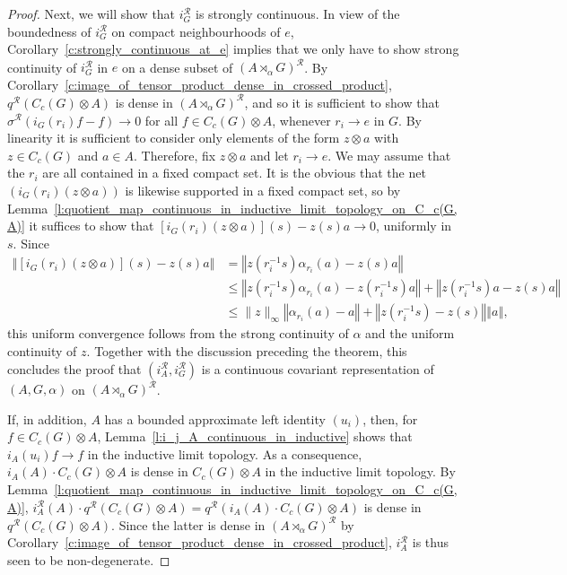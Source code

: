 \documentclass{amsart}
\theoremstyle{plain}
\theoremstyle{definition}
\numberwithin{equation}{section}
\begin{document}
\begin{proof}
Next, we will show that $i_G^{\mathcal R}$ is strongly continuous. In view of the boundedness of $i_G^{\mathcal R}$ on compact neighbourhoods of $e$, Corollary~\ref{c:strongly_continuous_at_e} implies that we only have to show strong continuity of $i_G^{\mathcal R}$ in $e$ on a dense subset of ${(A {\rtimes}_\alpha G)^\mathcal{R}}$. By Corollary~\ref{c:image_of_tensor_product_dense_in_crossed_product}, ${q^{\mathcal R}}(C_c(G) \otimes A)$ is dense in ${(A {\rtimes}_\alpha G)^\mathcal{R}}$, and so it is sufficient to show that ${\sigma^{\mathcal R}}(i_G(r_i)f - f) \to 0$ for all $f \in C_c(G) \otimes A$, whenever $r_i \to e$ in $G$. By linearity it is sufficient to consider only elements of the form $z \otimes a$ with $z \in C_c(G)$ and $a \in A$. Therefore, fix $z\otimes a$ and let $r_i \to e$. We may assume that the $r_i$ are all contained in a fixed compact set. It is the obvious that the net $(i_G(r_i)(z \otimes a))$ is likewise supported in a fixed compact set, so by Lemma~\ref{l:quotient_map_continuous_in_inductive_limit_topology_on_C_c(G,A)} it suffices to show that $[i_G(r_i)(z \otimes a)](s) - z(s)a \to 0$,
uniformly in $s$. Since
\begin{align*}
 {\left\Vert {[i_G(r_i)(z \otimes a)](s) - z(s)a} \right\Vert}&={\left\Vert {z(r_i^{-1}s)\alpha_{r_i}(a)-z(s)a} \right\Vert}\\
&\leq {\left\Vert {z(r_i^{-1}s)\alpha_{r_i}(a)-z(r_i^{-1}s)a} \right\Vert} + {\left\Vert {z(r_i^{-1}s)a-z(s)a} \right\Vert}\\
&\leq \|z\|_\infty{\left\Vert {\alpha_{r_i}(a)-a} \right\Vert} + {\left\Vert {z(r_i^{-1}s)-z(s)} \right\Vert} {\left\Vert {a} \right\Vert},
\end{align*}
this uniform convergence follows from the strong continuity of $\alpha$ and the uniform continuity of $z$.
Together with the discussion preceding the theorem, this concludes the proof that $(i_A^{\mathcal R}, i_G^{\mathcal R})$ is a continuous covariant representation of ${(A,G,\alpha)}$ on ${(A {\rtimes}_\alpha G)^\mathcal{R}}$.

If, in addition, $A$ has a bounded approximate left identity $(u_i)$, then, for $f\in C_c(G)\otimes A$, Lemma~\ref{l:i_j_A_continuous_in_inductive} shows that $i_A(u_i)f\to f$ in the inductive limit topology. As a consequence, $i_A(A)\cdot C_c(G)\otimes A$ is dense in $C_c(G)\otimes A$ in the inductive limit topology. By Lemma~\ref{l:quotient_map_continuous_in_inductive_limit_topology_on_C_c(G,A)}, $i_A^{\mathcal R}(A)\cdot{q^{\mathcal R}}(C_c(G)\otimes A)={q^{\mathcal R}}(i_A(A)\cdot C_c(G)\otimes A)$ is dense in ${q^{\mathcal R}}(C_c(G)\otimes A)$. Since the latter is dense in ${(A {\rtimes}_\alpha G)^\mathcal{R}}$ by Corollary~\ref{c:image_of_tensor_product_dense_in_crossed_product}, $i_A^{\mathcal R}$ is thus seen to be non-degenerate.
\end{proof}
\end{document}
